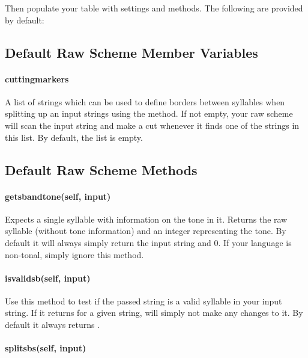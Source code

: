 \documentclass{ltxdockit}
\begin{document}
Then populate your table with settings and methods. The following are provided
by default:

\subsection{Default Raw Scheme Member Variables}

\paragraph{cutting\textunderscore{}markers}

A list of strings which can be used to define borders between syllables when
splitting up an input strings using the  method.
If not empty, your raw scheme will scan the input string and make a cut whenever
it finds one of the strings in this list. By default, the list is empty.

\subsection{Default Raw Scheme Methods}

\paragraph{get\textunderscore{}sb\textunderscore{}and\textunderscore{}tone(self, input)}

Expects a single syllable with information on the tone in it. Returns the raw
syllable (without tone information) and an integer representing the tone. By
default it will always simply return the input string and 0. If your language is
non-tonal, simply ignore this method.

\paragraph{is\textunderscore{}valid\textunderscore{}sb(self, input)}

Use this method to test if the passed string is a valid syllable in your input
string. If it returns  for a given string,  will
simply not make any changes to it. By default it always returns .

\paragraph{split\textunderscore{}sbs(self, input)}
\end{document}
